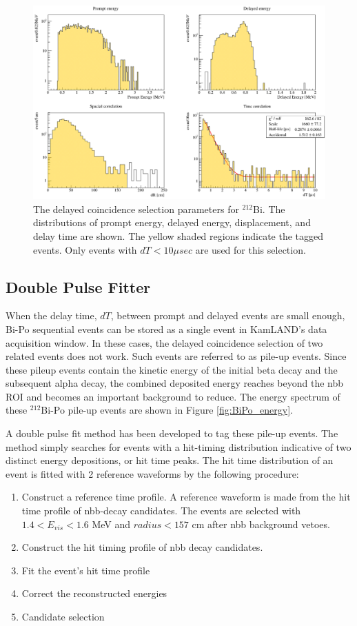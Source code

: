 \begin{figure}[htb]
	\centering
	\includegraphics[scale=0.45]{bi212.png}
	\caption{The delayed coincidence selection parameters for $^{212}$Bi. The distributions of prompt energy, delayed energy, displacement, and delay time are shown. The yellow shaded regions indicate the tagged events. Only events with $dT<10\mu sec$ are used for this selection.}
	\label{fig:BiPo212}
\end{figure}
\subsection*{Double Pulse Fitter}
When the delay time, $dT$, between prompt and delayed events are small enough, Bi-Po sequential events can be stored as a single event in KamLAND's data acquisition window. In these cases, the delayed coincidence selection of two related events does not work. Such events are referred to as pile-up events. Since these pileup events contain the kinetic energy of the initial beta decay and the subsequent alpha decay, the combined deposited energy reaches beyond the \0nbb ROI and becomes an important background to reduce. The energy spectrum of these $^{212}$Bi-Po pile-up events are shown in Figure \ref{fig:BiPo_energy}.

A double pulse fit method has been developed to tag these pile-up events. The method simply searches for events with a hit-timing distribution indicative of two distinct energy depositions, or hit time peaks. The hit time distribution of an event is fitted with 2 reference waveforms by the following procedure:
\begin{enumerate}
	\item Construct a reference time profile.
	A reference waveform is made from the hit time profile of \2nbb-decay candidates. The events are selected with $1.4 < E_{vis}<1.6$ MeV and $radius < 157$ cm after \0nbb background vetoes. 
	\item Construct the hit timing profile of \0nbb decay candidates.
	\item Fit the event's hit time profile
	\item Correct the reconstructed energies
	\item Candidate selection
\end{enumerate}


